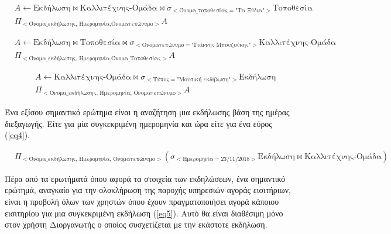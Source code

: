 \begin{equation} \label{eq1}
\begin{split}
&A \leftarrow \text{Εκδήλωση} \bowtie
\text{Καλλιτέχνης-Ομάδα} \bowtie
\sigma_{<\text{Όνομα\_τοποθεσίας} = \text{"Τα Ξύδια"}>}
\text{Τοποθεσία}
\\
&\Pi_{<\text{Όνομα\_εκδήλωσης, Ημερομηνία,Ονοματεπώνυμο}>}A
\end{split}
\end{equation}

\begin{equation} \label{eq2}
\begin{split}
&A \leftarrow \text{Εκδήλωση} \bowtie
\text{Τοποθεσία} \bowtie
\sigma_{<\text{Ονοματεπώνυμο} = \text{"Γιάννης Μπουζούκης"}>}
\text{Καλλιτέχνης-Ομάδα}
\\
&\Pi_{<\text{Όνομα\_εκδήλωσης, Ημερομηνία,Όνομα\_Τοποθεσίας}>}A
\end{split}
\end{equation}

\begin{equation} \label{eq3}
\begin{split}
&A \leftarrow \text{Καλλιτέχνης-Ομάδα} \bowtie
\sigma_{<\text{Τύπος} = \text{"Μουσική εκδήλωση"}>}\text{Εκδήλωση}
\\
&\Pi_{<\text{Όνομα\_εκδήλωσης, Ημερομηνία, Ονοματεπώνυμο}>}A
\end{split}
\end{equation}

Ένα εξίσου σημαντικό ερώτημα  είναι η αναζήτηση μια εκδήλωσης βάση της
ημέρας διεξαγωγής. Είτε για μία συγκεκριμένη ημερομηνία και ώρα είτε
για ένα εύρος (\ref{eq4}).

\begin{equation}
  \label{eq4}
  \begin{split}
    &\Pi_{<\text{Όνομα\_εκδήλωσης, Ημερομηνία, Ονοματεπώνυμο}>}(
    \sigma_{<\text{Ημερομηνία} = 23/11/2018>} \text{Εκδήλωση} \bowtie
    \text{Καλλιτέχνης-Ομάδα})
  \end{split}
\end{equation}

Πέρα από τα ερωτήματά όπου αφορά τα στοιχεία των εκδηλώσεων, ένα
σημαντικό ερώτημά, αναγκαίο για την ολοκλήρωση της παροχής υπηρεσιών
αγοράς εισιτήριων, είναι η προβολή όλων των χρηστών όπου έχουν
πραγματοποιήσει αγορά κάποιου εισιτηρίου για μια συγκεκριμένη εκδήλωση
(\ref{eq5}). Αυτό θα είναι διαθέσιμη μόνο στον χρήστη Διοργανωτής ο
οποίος συσχετίζεται με την εκάστοτε εκδήλωση.

